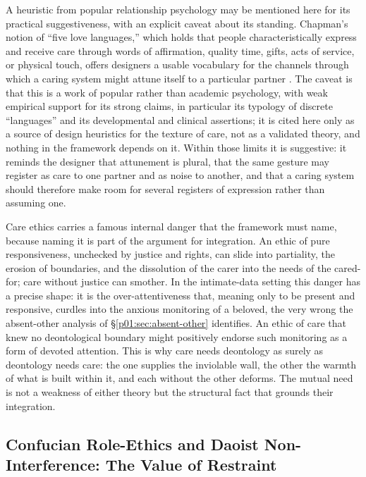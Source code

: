 A heuristic from popular relationship psychology may be mentioned here for its practical suggestiveness, with an explicit caveat about its standing. Chapman's notion of ``five love languages,'' which holds that people characteristically express and receive care through words of affirmation, quality time, gifts, acts of service, or physical touch, offers designers a usable vocabulary for the channels through which a caring system might attune itself to a particular partner \parencite{chapman1992five}. The caveat is that this is a work of popular rather than academic psychology, with weak empirical support for its strong claims, in particular its typology of discrete ``languages'' and its developmental and clinical assertions; it is cited here only as a source of design heuristics for the texture of care, not as a validated theory, and nothing in the framework depends on it. Within those limits it is suggestive: it reminds the designer that attunement is plural, that the same gesture may register as care to one partner and as noise to another, and that a caring system should therefore make room for several registers of expression rather than assuming one.

Care ethics carries a famous internal danger that the framework must name, because naming it is part of the argument for integration. An ethic of pure responsiveness, unchecked by justice and rights, can slide into partiality, the erosion of boundaries, and the dissolution of the carer into the needs of the cared-for; care without justice can smother. In the intimate-data setting this danger has a precise shape: it is the over-attentiveness that, meaning only to be present and responsive, curdles into the anxious monitoring of a beloved, the very wrong the absent-other analysis of §\ref{p01:sec:absent-other} identifies. An ethic of care that knew no deontological boundary might positively endorse such monitoring as a form of devoted attention. This is why care needs deontology as surely as deontology needs care: the one supplies the inviolable wall, the other the warmth of what is built within it, and each without the other deforms. The mutual need is not a weakness of either theory but the structural fact that grounds their integration.

\subsection{Confucian Role-Ethics and Daoist Non-Interference: The Value of Restraint}\label{p01:sec:confucian}

